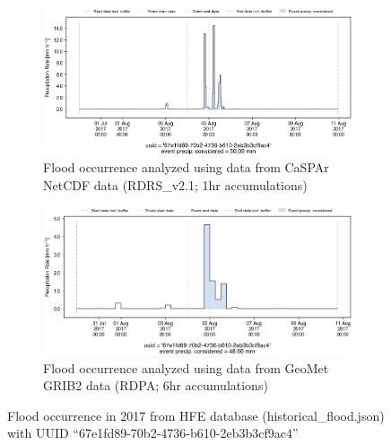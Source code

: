 \documentclass[10pt,a4paper,titlepage,parskip]{scrartcl}
\begin{document}
\begin{figure}[h]
	\begin{subfigure}[a]{1.0\textwidth}
		\centering
		\includegraphics[width=\linewidth]{figures/compare_Geomet_CaSPAr/interpolated_at_stations_occurrence_1737_identified-timesteps_RDRS_v2.1.png}
		\caption{Flood occurrence analyzed using data from CaSPAr NetCDF data (RDRS\_v2.1; 1hr accumulations)}
	\end{subfigure}
	\par\bigskip\bigskip
	\begin{subfigure}[b]{1.0\textwidth}
		\centering
		\includegraphics[width=\linewidth]{figures/compare_Geomet_CaSPAr/interpolated_at_stations_occurrence_1737_identified-timesteps_rdpa_10km_6f.png}
		\caption{Flood occurrence analyzed using data from GeoMet GRIB2 data (RDPA; 6hr accumulations)}
	\end{subfigure}
	\par\bigskip\bigskip
	\caption{Flood occurrence in 2017 from HFE database (historical\_flood.json) with UUID ``67e1fd89-70b2-4736-b610-2eb3b3cf9ac4''}
\end{figure}
\pagebreak
\end{document}
